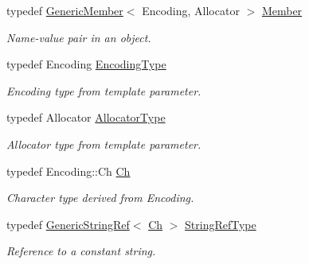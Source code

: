 \begin{DoxyCompactItemize}
\mbox{\label{class_generic_value_a7ccf27c44058b4c11c3efc6473afb886}} 
typedef \hyperlink{struct_generic_member}{Generic\+Member}$<$ Encoding, Allocator $>$ \hyperlink{class_generic_value_a7ccf27c44058b4c11c3efc6473afb886}{Member}
\begin{DoxyCompactList}\small\item\em Name-\/value pair in an object. \end{DoxyCompactList}\item 
\mbox{\label{class_generic_value_a28c2cb8d04d12566c1af37597a46d209}} 
typedef Encoding \hyperlink{class_generic_value_a28c2cb8d04d12566c1af37597a46d209}{Encoding\+Type}
\begin{DoxyCompactList}\small\item\em Encoding type from template parameter. \end{DoxyCompactList}\item 
\mbox{\label{class_generic_value_a7beb83860c1b8d2a0e2a7da9796b2fa1}} 
typedef Allocator \hyperlink{class_generic_value_a7beb83860c1b8d2a0e2a7da9796b2fa1}{Allocator\+Type}
\begin{DoxyCompactList}\small\item\em Allocator type from template parameter. \end{DoxyCompactList}\item 
\mbox{\label{class_generic_value_ade0e0ce64ccd5d852da57a35e720bafb}} 
typedef Encoding\+::\+Ch \hyperlink{class_generic_value_ade0e0ce64ccd5d852da57a35e720bafb}{Ch}
\begin{DoxyCompactList}\small\item\em Character type derived from Encoding. \end{DoxyCompactList}\item 
\mbox{\label{class_generic_value_a32e0f30ee278072374c8168b14d3317f}} 
typedef \hyperlink{struct_generic_string_ref}{Generic\+String\+Ref}$<$ \hyperlink{class_generic_value_ade0e0ce64ccd5d852da57a35e720bafb}{Ch} $>$ \hyperlink{class_generic_value_a32e0f30ee278072374c8168b14d3317f}{String\+Ref\+Type}
\begin{DoxyCompactList}\small\item\em Reference to a constant string. \end{DoxyCompactList}\item 

\end{DoxyCompactItemize}
